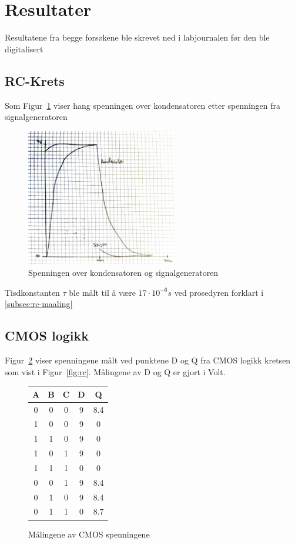 \section{Resultater}

Resultatene fra begge forsøkene ble skrevet ned i labjournalen før den ble digitalisert

\subsection{RC-Krets}

Som Figur~\ref{fig:rc-resultater} viser hang spenningen over kondensatoren etter spenningen fra signalgeneratoren 

\begin{figure}[!htb]
    \centering
    \includegraphics[height=6cm]{figurer/RC-figur.pdf}
    \caption{Spenningen over kondensatoren og signalgeneratoren}
    \label{fig:rc-resultater}
\end{figure}

Tisdkonstanten $\tau$ ble målt til å være $17\cdot 10^{-6}s$ ved prosedyren forklart i \ref{subsec:rc-maaling}

\subsection{CMOS logikk}

Figur~\ref{fig:cmos-resultater} viser spenningene målt ved punktene D og Q fra CMOS logikk kretsen som vist i Figur~\ref{fig:rc}. Målingene av D og Q er gjort i Volt.

\begin{figure}[!htb]
    \centering
    \begin{tabular}{|c|c|c|c|c|}
        \hline
        \textbf{A} & \textbf{B} & \textbf{C} & \textbf{D} & \textbf{Q} \\ \hline
        0 & 0 & 0 & 9 & 8.4 \\
        1 & 0 & 0 & 9 & 0 \\
        1 & 1 & 0 & 9 & 0 \\
        1 & 0 & 1 & 9 & 0 \\
        1 & 1 & 1 & 0 & 0 \\
        0 & 0 & 1 & 9 & 8.4 \\
        0 & 1 & 0 & 9 & 8.4 \\
        0 & 1 & 1 & 0 & 8.7 \\ \hline
    \end{tabular}
    \caption{Målingene av CMOS spenningene}
    \label{fig:cmos-resultater}
\end{figure}
